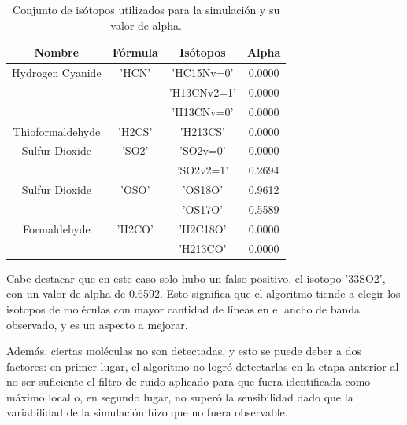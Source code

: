 \begin {table}[H]
\begin{center}
	\begin{tabular}{|c|c|c|c|}
		\hline Nombre & Fórmula &  Isótopos & Alpha \\ 
		
		
		\hline	Hydrogen Cyanide & 'HCN'  & 'HC15Nv=0' & 0.0000\\
								 &		  & 'H13CNv2=1' & 0.0000\\
								 &		  & 'H13CNv=0' & 0.0000\\ 
								
		
		\hline	Thioformaldehyde & 'H2CS' & 'H213CS' & 0.0000\\
		
		\hline	Sulfur Dioxide & 'SO2'	  & 'SO2v=0' & 0.0000\\
								&		  & 'SO2v2=1'& 0.2694 \\
		
		\hline	Sulfur Dioxide & 'OSO' & 'OS18O' & 0.9612\\
							   &	   & 'OS17O' & 0.5589\\
		
		\hline	Formaldehyde & 'H2CO'  & 'H2C18O' & 0.0000\\
							 &		   & 'H213CO' & 0.0000\\
		
		\hline 
	\end{tabular}
	\caption {Conjunto de isótopos utilizados para la simulación y su valor de alpha.}
\end{center}
\end{table}

Cabe destacar que en este caso solo hubo un falso positivo, el isotopo '33SO2', con un valor de alpha de 0.6592. Esto significa que el algoritmo tiende a elegir los isotopos de moléculas con mayor cantidad de líneas en el ancho de banda observado, y es un aspecto a mejorar. 

Además, ciertas moléculas no son detectadas, y esto se puede deber a dos factores: en primer lugar, el algoritmo no logró detectarlas en la etapa anterior al no ser suficiente el filtro de ruido aplicado para que fuera identificada como máximo local o, en segundo lugar, no superó la sensibilidad dado que la variabilidad de la simulación hizo que no fuera observable. 


